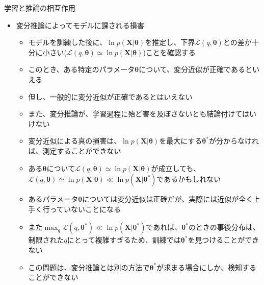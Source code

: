 \documentclass[dvipdfmx,notheorems,t]{beamer}
\begin{document}
\begin{frame}{学習と推論の相互作用}
\begin{itemize}
	\item 変分推論によってモデルに課される損害
	\begin{itemize}
		\item モデルを訓練した後に、$\ln p(\bm{X} | \bm{\theta})$を推定し、下界$\mathcal{L}(q, \bm{\theta})$との\alert{差が十分に小さい}($\mathcal{L}(q, \bm{\theta}) \simeq \ln p(\bm{X} | \bm{\theta})$)ことを確認する
		\item このとき、\color{red}ある特定のパラメータ$\bm{\theta}$について\normalcolor 、変分近似が正確であるといえる
		\newline
		
		\item 但し、\alert{一般的に}変分近似が正確であるとは\alert{いえない}
		\item また、変分推論が、学習過程に殆ど害を及ぼさないとも結論付けては\alert{いけない}
		\newline
		
		\item 変分近似による\alert{真の損害}は、$\ln p(\bm{X} | \bm{\theta})$を最大にする$\bm{\theta}^*$が分からなければ、測定することができない
		\newline
		
		\item ある$\bm{\theta}$について$\mathcal{L}(q, \bm{\theta}) \simeq \ln p(\bm{X} | \bm{\theta})$が成立しても、$\mathcal{L}(q, \bm{\theta}) \simeq \ln p(\bm{X} | \bm{\theta}) \ll \ln p(\bm{X} | \bm{\theta}^*)$であるかもしれない
		\item あるパラメータ$\bm{\theta}$については変分近似は正確だが、実際には近似が全く上手く行っていないことになる
		\newline
		
		\item また$\max_q \mathcal{L}(q, \bm{\theta}^*) \ll \ln p(\bm{X} | \bm{\theta}^*)$であれば、$\bm{\theta}^*$のときの事後分布は、制限された$q$にとって複雑すぎるため、訓練では$\bm{\theta}^*$を見つけることができない
		\item この問題は、変分推論とは別の方法で$\bm{\theta}^*$が求まる場合にしか、検知することができない
	\end{itemize}
\end{itemize}

\end{frame}
\end{document}
